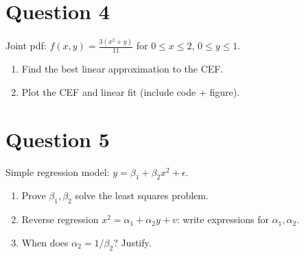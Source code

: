 \documentclass[12pt,a4paper]{article}
\begin{document}
\section*{Question 4}
Joint pdf: $f(x, y) = \frac{3(x^2 + y)}{11}$ for $0 \leq x \leq 2$, $0 \leq y \leq 1$.

\begin{enumerate}[label=(\alph*)]
  \item Find the best linear approximation to the CEF.  
  \item Plot the CEF and linear fit (include code + figure).
\end{enumerate}

\section*{Question 5}
Simple regression model: $y = \beta_1 + \beta_2 x^2 + \epsilon$.

\begin{enumerate}[label=(\alph*)]
  \item Prove $\beta_1,\beta_2$ solve the least squares problem.  
  \item Reverse regression $x^2 = \alpha_1 + \alpha_2 y + v$: write expressions for $\alpha_1,\alpha_2$.  
  \item When does $\alpha_2 = 1/\beta_2$? Justify.
\end{enumerate}
\end{document}
